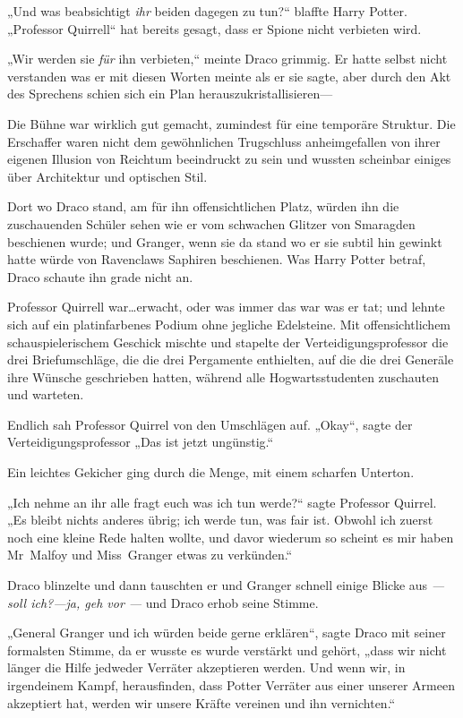 {„Und was beabsichtigt \emph{ihr} beiden dagegen zu tun?“ blaffte Harry Potter. „Professor Quirrell“ hat bereits gesagt, dass er Spione nicht verbieten wird.

„Wir werden sie \emph{für} ihn verbieten,“ meinte Draco grimmig. Er hatte selbst nicht verstanden was er mit diesen Worten meinte als er sie sagte, aber durch den Akt des Sprechens schien sich ein Plan herauszukristallisieren—

Die Bühne war wirklich gut gemacht, zumindest für eine temporäre Struktur. Die Erschaffer waren nicht dem gewöhnlichen Trugschluss anheimgefallen von ihrer eigenen Illusion von Reichtum beeindruckt zu sein und wussten scheinbar einiges über Architektur und optischen Stil.

Dort wo Draco stand, am für ihn offensichtlichen Platz, würden ihn die zuschauenden Schüler sehen wie er vom schwachen Glitzer von Smaragden beschienen wurde; und Granger, wenn sie da stand wo er sie subtil hin gewinkt hatte würde von Ravenclaws Saphiren beschienen. Was Harry Potter betraf, Draco schaute ihn grade nicht an.

Professor Quirrell war…erwacht, oder was immer das war was er tat; und lehnte sich auf ein platinfarbenes Podium ohne jegliche Edelsteine. Mit offensichtlichem schauspielerischem Geschick mischte und stapelte der Verteidigungsprofessor die drei Briefumschläge, die die drei Pergamente enthielten, auf die die drei Generäle ihre Wünsche geschrieben hatten, während alle Hogwartsstudenten zuschauten und warteten.

Endlich sah Professor Quirrel von den Umschlägen auf. „Okay“, sagte der Verteidigungsprofessor „Das ist jetzt ungünstig.“

Ein leichtes Gekicher ging durch die Menge, mit einem scharfen Unterton.

„Ich nehme an ihr alle fragt euch was ich tun werde?“ sagte Professor Quirrel. „Es bleibt nichts anderes übrig; ich werde tun, was fair ist. Obwohl ich zuerst noch eine kleine Rede halten wollte, und davor wiederum so scheint es mir haben Mr~Malfoy und Miss~Granger etwas zu verkünden.“

Draco blinzelte und dann tauschten er und Granger schnell einige Blicke aus \emph{— soll ich?—ja, geh vor —} und Draco erhob seine Stimme.

„General Granger und ich würden beide gerne erklären“, sagte Draco mit seiner formalsten Stimme, da er wusste es wurde verstärkt und gehört, „dass wir nicht länger die Hilfe jedweder Verräter akzeptieren werden. Und wenn wir, in irgendeinem Kampf, herausfinden, dass Potter Verräter aus einer unserer Armeen akzeptiert hat, werden wir unsere Kräfte vereinen und ihn vernichten.“

}
